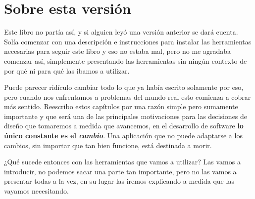 \chapter*{Sobre esta versión}
  Este libro no partía así, y si alguien leyó una versión anterior se dará cuenta.
  Solía comenzar con una descripción e instrucciones para instalar las herramientas necesarias para
  seguir este libro y eso no estaba mal, pero no me agradaba comenzar así, simplemente presentando
  las herramientas sin ningún contexto de por qué ni para qué las ibamos a utilizar.

  Puede parecer ridículo cambiar todo lo que ya había escrito solamente por eso, pero cuando nos 
  enfrentamos a problemas del mundo real esto comienza a cobrar más sentido.
  Reescribo estos capítulos por una razón simple pero sumamente importante y que será una de las
  principales motivaciones para las decisiones de diseño que tomaremos a medida que avancemos, en
  el desarrollo de software \textbf{lo único constante es el 
  \textit{cambio}}.\autocite{freemanChapterIntroDesign,metzChapterObjectOrientedDesign2013}
  Una aplicación que no puede adaptarse a los cambios, sin importar que tan bien funcione, está
  destinada a morir.

  ¿Qué sucede entonces con las herramientas que vamos a utilizar?
  Las vamos a introducir, no podemos sacar una parte tan importante, pero no las vamos a presentar
  todas a la vez, en su lugar las iremos explicando a medida que las vayamos necesitando.